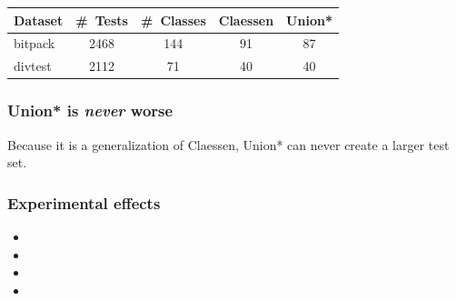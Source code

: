 \documentclass[svgnames,14pt]{beamer}
\theoremstyle{definition}
\begin{document}
\begin{frame}
\def\?{\phantom0}
\begin{tabular}{ | l | c | c | c | c |}
\hline
Dataset & \#~Tests & \#\ Classes & Claessen & Union*\\ 
\hline
bitpack & 2468 & 144 & 91 & 87\\
divtest & 2112 & \?71 & 40 & 40\\
\hline
\end{tabular}
\end{frame}

\begin{frame}
\frametitle{Union* is \emph{never} worse}
Because it is a generalization of Claessen, Union* can never create a larger test set.
\end{frame}

\begin{frame}
\frametitle{Experimental effects}
\begin{itemize}
\item {}
\item {}
\item {}
\item {}
\end{itemize}
\end{frame}
\end{document}
